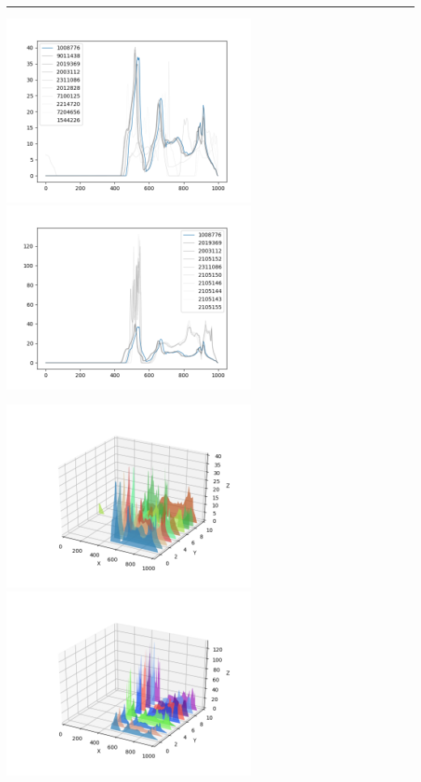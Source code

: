 \documentclass{article}
\begin{document}
\begin{center}

\noindent\rule{\textwidth}{1pt}

\includegraphics[height=6cm, width=8cm]{1.png}\includegraphics[height=6cm, width=8cm]{1_cos.png}

\includegraphics[height=6cm, width=8cm]{1_3d.png} \includegraphics[height=6cm, width=8cm]{1_cos_3d.png}


\end{center}
\end{document}
